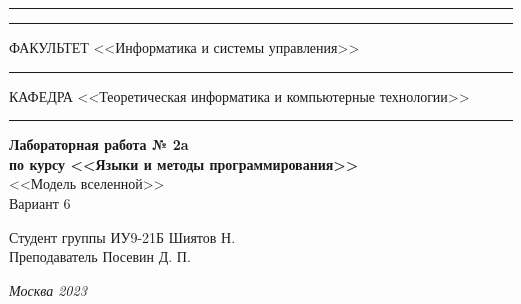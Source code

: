 \documentclass[a4paper, 14pt]{extarticle}
\begin{document}
\begin{titlepage}
\vspace{-25pt}
\hspace{-35pt}\rule{\textwidth}{2.3pt}

\vspace*{-20.3pt}
\hspace{-35pt}\rule{\textwidth}{0.4pt}

\vspace{1.5ex}
\hspace{-35pt} \noindent \small ФАКУЛЬТЕТ\hspace{80pt} <<Информатика и системы управления>>

\vspace*{-16pt}
\hspace{47pt}\rule{0.83\textwidth}{0.4pt}

\vspace{0.5ex}
\hspace{-35pt} \noindent \small КАФЕДРА\hspace{50pt} <<Теоретическая информатика и компьютерные технологии>>

\vspace*{-16pt}
\hspace{30pt}\rule{0.866\textwidth}{0.4pt}
  
\vspace{11em}

\begin{center}
\Large {\bf Лабораторная работа № 2a} \\ 
\large {\bf по курсу <<Языки и методы программирования>>} \\
\large <<Модель вселенной>> \\
\Large Вариант 6
\end{center}\normalsize

\vspace{8em}


\begin{flushright}
  {Студент группы ИУ9-21Б Шиятов Н. \hspace*{15pt}\\ 
  \vspace{2ex}
  Преподаватель Посевин Д. П.\hspace*{15pt}}
\end{flushright}

\bigskip

\vfill
 

\begin{center}
\textsl{Москва 2023}
\end{center}
\end{titlepage}
\end{document}
